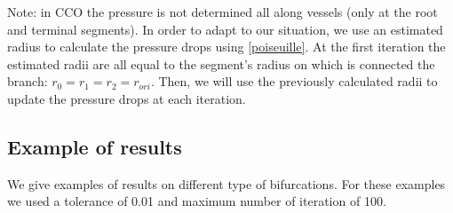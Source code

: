 \documentclass[a4paper, 11pt]{article} %
\begin{document}
Note: in CCO the pressure is not determined all along vessels (only at the root and terminal segments). In order to adapt to our situation, we use an estimated radius to calculate the pressure drops using \eqref{poiseuille}. At the first iteration the estimated radii are all equal to the segment's radius on which is connected the branch: $r_0 = r_1 = r_2 = r_{ori}$.
Then, we will use the previously calculated radii to update the pressure drops at each iteration.

\subsection*{Example of results}
We give examples of results on different type of bifurcations. For these examples we used a tolerance of 0.01 and maximum number of iteration of 100.\\
\end{document}
